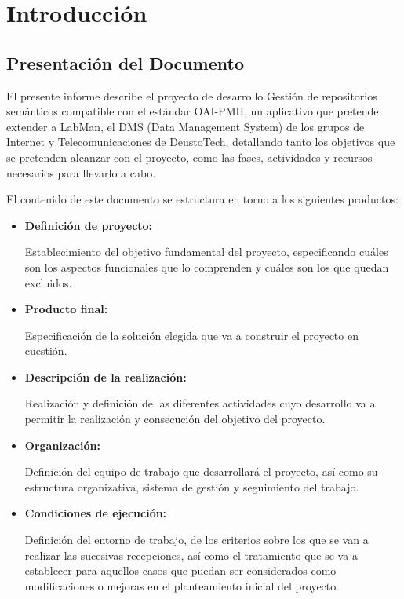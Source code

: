\chapter{Introducción}\label{cha:introduccion}

\section{Presentación del Documento}

El presente informe describe el proyecto de desarrollo Gestión de repositorios semánticos compatible con el estándar OAI-PMH, un aplicativo que pretende extender a LabMan, el DMS (Data Management System) de los grupos de Internet y Telecomunicaciones de DeustoTech, detallando tanto los objetivos que se pretenden alcanzar con el proyecto, como las fases, actividades y recursos necesarios para llevarlo a cabo.

El contenido de este documento se estructura en torno a los siguientes productos:

\begin{itemize}
	\item \textbf{Definición de proyecto:}
		
	Establecimiento del objetivo fundamental del proyecto, especificando cuáles son los aspectos funcionales que lo comprenden y cuáles son los que quedan excluidos.
	
	\item \textbf{Producto final:}
		
	Especificación de la solución elegida que va a construir el proyecto en cuestión.
	
	\item \textbf{Descripción de la realización:}

	Realización y definición de las diferentes actividades cuyo desarrollo va a permitir la realización y consecución del objetivo del proyecto.

	\item \textbf{Organización:}
	
	Definición del equipo de trabajo que desarrollará el proyecto, así como su estructura organizativa, sistema de gestión y seguimiento del trabajo.

	\item \textbf{Condiciones de ejecución:}

	Definición del entorno de trabajo, de los criterios sobre los que se van a realizar las sucesivas recepciones, así como el tratamiento que se va a establecer para aquellos casos que puedan ser considerados como modificaciones o mejoras en el planteamiento inicial del proyecto.
\end{itemize}


